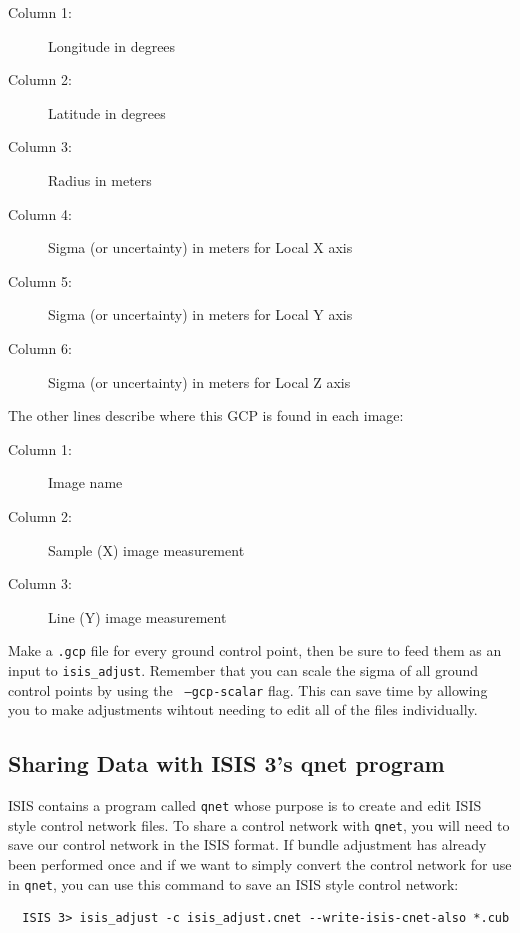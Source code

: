 \begin{myindentpar}{2cm}
\begin{description}
  \item[Column 1:] Longitude in degrees
  \item[Column 2:] Latitude in degrees
  \item[Column 3:] Radius in meters
  \item[Column 4:] Sigma (or uncertainty) in meters for Local X axis
  \item[Column 5:] Sigma (or uncertainty) in meters for Local Y axis
  \item[Column 6:] Sigma (or uncertainty) in meters for Local Z axis
\end{description}
\end{myindentpar}

The other lines describe where this \ac{GCP} is found in each image:

\begin{myindentpar}{2cm}
\begin{description}
  \item[Column 1:] Image name
  \item[Column 2:] Sample (X) image measurement
  \item[Column 3:] Line (Y) image measurement
\end{description}
\end{myindentpar}

Make a {\tt .gcp} file for every ground control point, then be sure
to feed them as an input to {\tt isis\_adjust}. Remember that you
can scale the sigma of all ground control points by using the {\tt
--gcp-scalar} flag. This can save time by allowing you to make
adjustments wihtout needing to edit all of the files individually.

\subsection{Sharing Data with ISIS 3's qnet program}

\ac{ISIS} contains a program called \texttt{qnet} whose purpose is
to create and edit \ac{ISIS} style control network files. To share
a control network with \texttt{qnet}, you will need to save our
control network in the \ac{ISIS} format. If bundle adjustment has
already been performed once and if we want to simply convert the
control network for use in \texttt{qnet}, you can use this command
to save an \ac{ISIS} style control network:

\begin{verbatim}
  ISIS 3> isis_adjust -c isis_adjust.cnet --write-isis-cnet-also *.cub
\end{verbatim}

